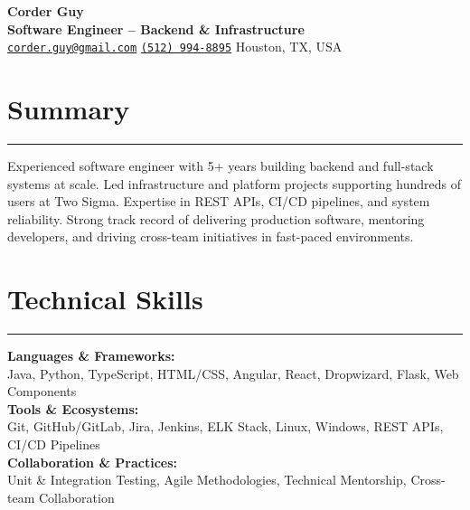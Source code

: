 \documentclass[11pt]{article}
\begin{document}
\begin{center}
  {\Huge\textbf{Corder Guy}} \\
  \vspace{1em}
  {\Large\textbf{Software Engineer -- Backend \& Infrastructure}} \\
  \href{mailto:corder.guy@gmail.com}{\texttt{corder.guy@gmail.com}}
  \textbar{}
  \href{tel:+15129948895}{\texttt{(512) 994-8895}}
  \textbar{}
  Houston, TX, USA
\end{center}

\newcommand{\sectionline}{\vspace{-0.75em}\hrule\vspace{0.75em}}
\newcommand{\mainsection}[1]{\section*{#1} \sectionline}

\mainsection{Summary}
Experienced software engineer with 5+ years building backend and full-stack systems at scale. Led infrastructure and platform projects supporting hundreds of users at Two Sigma. Expertise in REST APIs, CI/CD pipelines, and system reliability. Strong track record of delivering production software, mentoring developers, and driving cross-team initiatives in fast-paced environments.

\newcommand{\skillsection}[2]{\textbf{#1:} \\ \hspace*{1em} #2}

\mainsection{Technical Skills}
\skillsection{Languages \& Frameworks}{Java, Python, TypeScript, HTML/CSS, Angular, React, Dropwizard, Flask, Web Components} \\
\skillsection{Tools \& Ecosystems}{Git, GitHub/GitLab, Jira, Jenkins, ELK Stack, Linux, Windows, REST APIs, CI/CD Pipelines} \\
\skillsection{Collaboration \& Practices}{Unit \& Integration Testing, Agile Methodologies, Technical Mentorship, Cross-team Collaboration}
\end{document}
